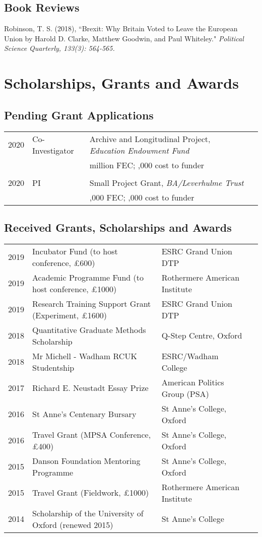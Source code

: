 \documentclass[11pt, a4paper]{article}
\begin{document}
 \subsection*{Book Reviews}

  Robinson, T. S. (2018), ``Brexit: Why Britain Voted to Leave the European Union by Harold D. Clarke, Matthew Goodwin, and Paul Whiteley."\textit{ Political Science Quarterly, 133(3): 564-565.}

\section*{Scholarships, Grants and Awards}

\subsection*{Pending Grant Applications}

\begin{tabular}{llll}
	 2020 & Co-Investigator & Archive and Longitudinal Project, \textit{Education Endowment Fund} \\
   & & \textsterling1.7 million FEC; \textsterling762,000 cost to funder \\ \\
   2020 & PI & Small Project Grant, \textit{BA/Leverhulme Trust} \\
   & & \textsterling33,000 FEC; \textsterling10,000 cost to funder \\
 \end{tabular}

\subsection*{Received Grants, Scholarships and Awards}
 \begin{tabular}{llll}
     2019 & Incubator Fund (to host conference, £600) & ESRC Grand Union DTP \\
     2019 & Academic Programme Fund (to host conference, £1000) & Rothermere American Institute \\
     2019 & Research Training Support Grant (Experiment, £1600) & ESRC Grand Union DTP \\
     2018 & Quantitative Graduate Methods Scholarship & Q-Step Centre, Oxford \\
     2018 & Mr Michell - Wadham RCUK Studentship & ESRC/Wadham College\\
     2017 & Richard E. Neustadt Essay Prize & American Politics Group (PSA) \\
     2016 & St Anne's Centenary Bursary & St Anne's College, Oxford \\
     2016 & Travel Grant (MPSA Conference, £400) & St Anne's College, Oxford \\
     2015 & Danson Foundation Mentoring Programme & St Anne's College, Oxford \\
     2015 & Travel Grant (Fieldwork, £1000) & Rothermere American Institute \\
     2014 & Scholarship of the University of Oxford (renewed 2015) & St Anne's College

 \end{tabular}
\end{document}

